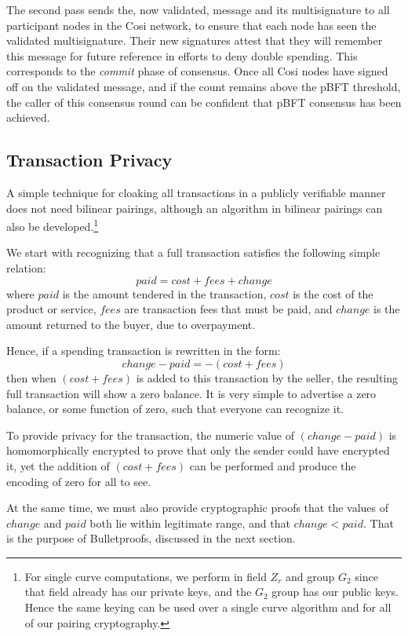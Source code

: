\documentclass{yellowpaper}
\begin{document}
The second pass sends the, now validated, message and its multisignature to all participant nodes in the Cosi network, to ensure that each node has seen the validated multisignature. Their new signatures attest that they will remember this message for future reference in efforts to deny double spending. This corresponds to the {\em{commit}} phase of consensus. Once all Cosi nodes have signed off on the validated message, and if the count remains above the pBFT threshold, the caller of this consensus round can be confident that pBFT consensus has been achieved.
\subsection{Transaction Privacy}
A simple technique for cloaking all transactions in a publicly verifiable manner does not need bilinear pairings, although an algorithm in bilinear pairings can also be developed.\footnote{For single curve computations, we perform in field $Z_r$ and group $G_2$ since that field already has our private keys, and the $G_2$ group has our public keys. Hence the same keying can be used over a single curve algorithm and for all of our pairing cryptography.}

We start with recognizing that a full transaction satisfies the following simple relation:
$$paid = cost + fees + change$$
where $paid$ is the amount tendered in the transaction, $cost$ is the cost of the product or service, $fees$ are transaction fees that must be paid, and $change$ is the amount returned to the buyer, due to overpayment.

Hence, if a spending transaction is rewritten in the form:
$$change - paid = -(cost + fees)$$
then when $(cost + fees)$ is added to this transaction by the seller, the resulting full transaction will show a zero balance. It is very simple to advertise a zero balance, or some function of zero, such that everyone can recognize it.

To provide privacy for the transaction, the numeric value of $(change - paid)$ is homomorphically encrypted to prove that only the sender could have encrypted it, yet the addition of $(cost + fees)$ can be performed and produce the encoding of zero for all to see. 

At the same time, we must also provide cryptographic proofs that the values of $change$ and $paid$ both lie within legitimate range, and that $change < paid$. That is the purpose of Bulletproofs, discussed in the next section.
\end{document}
